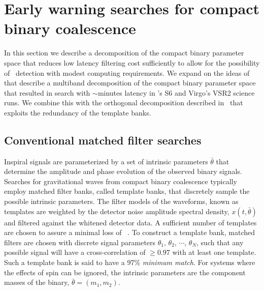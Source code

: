 \section{Early warning searches for compact binary coalescence}
\label{SECII}\label{sec:method}

In this section we describe a decomposition of the compact binary parameter
space that reduces low latency filtering cost sufficiently to allow for the
possibility of \earlywarning\ detection with modest computing requirements.  We
expand on the ideas of~\cite{Marion2004, Buskulic2010} that describe a
multiband decomposition of the compact binary parameter space that resulted in
search with $\sim$minutes latency in \LIGO's S6 and Virgo's VSR2 science runs.
We combine this with the orthogonal decomposition described
in~\cite{Cannon:2010p10398} that exploits the redundancy of the template banks.

\subsection{Conventional \CBC{} matched filter searches}

Inspiral signals are parameterized by a set of intrinsic parameters
$\bar{\theta}$ that determine the amplitude and phase evolution of the observed
binary signals.  Searches for gravitational waves from compact binary
coalescence typically employ matched filter banks, called template banks,
\cite{findchirppaper} that discretely sample the possible intrinsic parameters.
The filter models of the waveforms, known as templates are weighted by the
detector noise amplitude spectral density, $x(t,\bar{\theta})$ and filtered
against the whitened detector data.  A sufficient number of templates are
chosen to assure a minimal loss of \SNR~\cite{Owen:1995tm,Owen:1998dk}.  To
construct a template bank, matched filters are chosen with discrete signal
parameters $\theta_1,\, \theta_2,\, \cdots$, $\theta_N$, such that any possible
signal will have a cross-correlation of $\geq0.97$ with at least one template.
Such a template bank is said to have a 97\% {\em minimum match}. For systems
where the effects of spin can be ignored, the intrinsic parameters are the
component masses of the binary, $\bar{\theta} = (m_1, m_2)$. 

